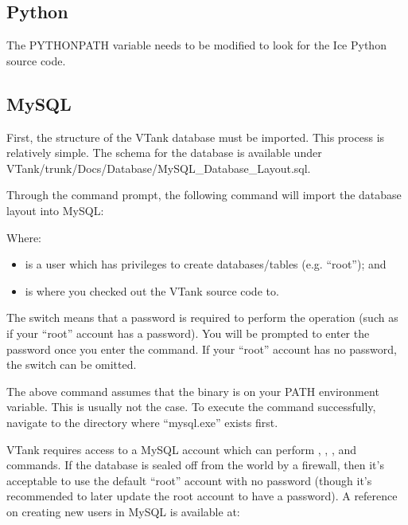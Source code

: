 \subsection{Python}

The PYTHONPATH variable needs to be modified to look for the Ice Python source code.

\subsection{MySQL}

First, the structure of the VTank database must be imported. This process is relatively simple. The schema for the database is available under VTank/trunk/Docs/Database/MySQL\_Database\_Layout.sql.

Through the command prompt, the following command will import the database layout into MySQL:


Where:
\begin{itemize}
	\item \command{[username]} is a user which has privileges to create databases/tables (e.g. ``root''); and
	\item {} is where you checked out the VTank source code to.
\end{itemize}

The  switch means that a password is required to perform the operation (such as if your ``root'' account has a password). You will be prompted to enter the password once you enter the command. If your ``root'' account has no password, the  switch can be omitted.

The above command assumes that the  binary is on your PATH environment variable. This is usually not the case. To execute the command successfully, navigate to the directory where ``mysql.exe'' exists first.

VTank requires access to a MySQL account which can perform , , , and  commands. If the database is sealed off from the world by a firewall, then it's acceptable to use the default ``root'' account with no password (though it's recommended to later update the root account to have a password). A reference on creating new users in MySQL is available at:

